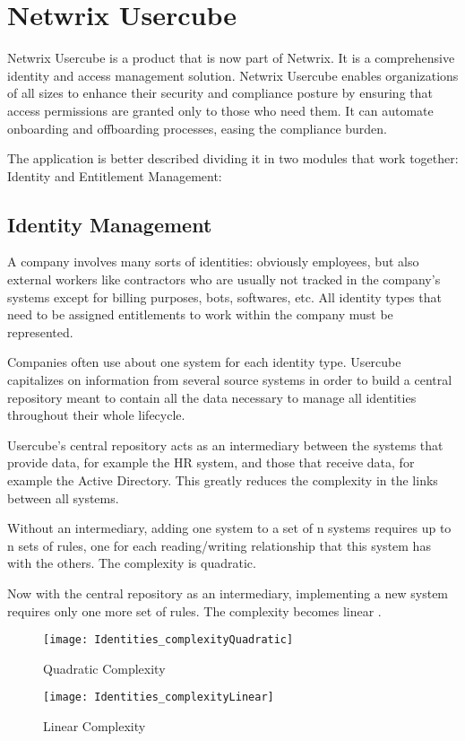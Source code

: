 \section{Netwrix Usercube}
\label{sec:Template}

Netwrix Usercube is a product that is now part of Netwrix. It is a comprehensive identity and access management solution. Netwrix Usercube enables organizations of all sizes to enhance their security and compliance posture by ensuring that access permissions are granted only to those who need them. It can automate onboarding and offboarding processes, easing the compliance burden.

The application is better described dividing it in two modules that work together: Identity and Entitlement Management:

\subsection{Identity Management}
\label{sec:Template}

A company involves many sorts of identities: obviously employees, but also external workers like contractors who are usually not tracked in the company's systems except for billing purposes, bots, softwares, etc. All identity types that need to be assigned entitlements to work within the company must be represented.

Companies often use about one system for each identity type. Usercube capitalizes on information from several source systems in order to build a central repository meant to contain all the data necessary to manage all identities throughout their whole lifecycle.

Usercube's central repository acts as an intermediary between the systems that provide data, for example the HR system, and those that receive data, for example the Active Directory. This greatly reduces the complexity in the links between all systems.

Without an intermediary, adding one system to a set of n systems requires up to n sets of rules, one for each reading/writing relationship that this system has with the others. The complexity is quadratic.

Now with the central repository as an intermediary, implementing a new system requires only one more set of rules. The complexity becomes linear \cite{UsercubeDocument}.

\begin{figure}[htbp]
  \centering
  \begin{minipage}{0.48\textwidth}
    \texttt{[image: Identities\_complexityQuadratic]}
    \caption{Quadratic Complexity}
    \label{fig:Identities_complexityQuadratic}
  \end{minipage}\hfill
  \begin{minipage}{0.48\textwidth}
    \texttt{[image: Identities\_complexityLinear]}
    \caption{Linear Complexity}
    \label{fig:Identities_complexityLinear}
  \end{minipage}
\end{figure}


